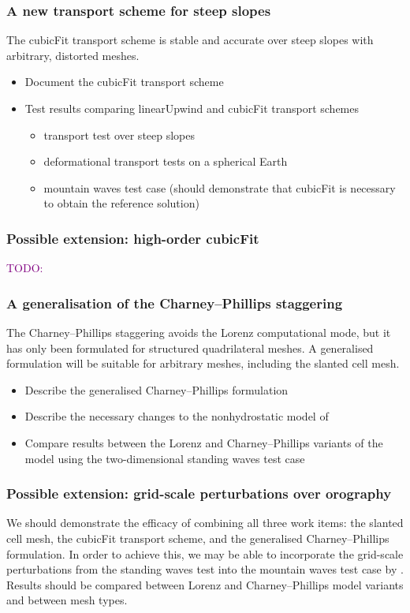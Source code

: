 \documentclass[a4paper,11pt]{article}
\newcommand{\TODO}[1]{\textcolor{purple}{TODO: \emph{#1}}}
\begin{document}
\subsubsection*{A new transport scheme for steep slopes}
\noindent The cubicFit transport scheme is stable and accurate over steep slopes with arbitrary, distorted meshes.
\begin{itemize}[itemsep=0.1em]
	\item Document the cubicFit transport scheme
	\item {Test results comparing linearUpwind and cubicFit transport schemes
	\begin{itemize}[itemsep=0.1em,topsep=0pt]
		\item \citet{shaw2017} transport test over steep slopes 
		\item \citet{lauritzen2012} deformational transport tests on a spherical Earth
		\item \citet{schaer2002} mountain waves test case (should demonstrate that cubicFit is necessary to obtain the reference solution)
	\end{itemize}}
\end{itemize}

\subsubsection*{Possible extension: high-order cubicFit}
\noindent \TODO{}
	
\subsubsection*{A generalisation of the Charney--Phillips staggering}
\noindent The Charney--Phillips staggering avoids the Lorenz computational mode, but it has only been formulated for structured quadrilateral meshes.  A generalised formulation will be suitable for arbitrary meshes, including the slanted cell mesh.
\begin{itemize}[itemsep=0.1em]
	\item Describe the generalised Charney--Phillips formulation
	\item Describe the necessary changes to the nonhydrostatic model of \citet{weller-shahrokhi2014}
	\item Compare results between the Lorenz and Charney--Phillips variants of the model using the two-dimensional standing waves test case
\end{itemize}

\subsubsection*{Possible extension: grid-scale perturbations over orography}
\noindent We should demonstrate the efficacy of combining all three work items: the slanted cell mesh, the cubicFit transport scheme, and the generalised Charney--Phillips formulation.  In order to achieve this, we may be able to incorporate the grid-scale perturbations from the standing waves test into the mountain waves test case by \citet{schaer2002}.
Results should be compared between Lorenz and Charney--Phillips model variants and between mesh types.
\end{document}
